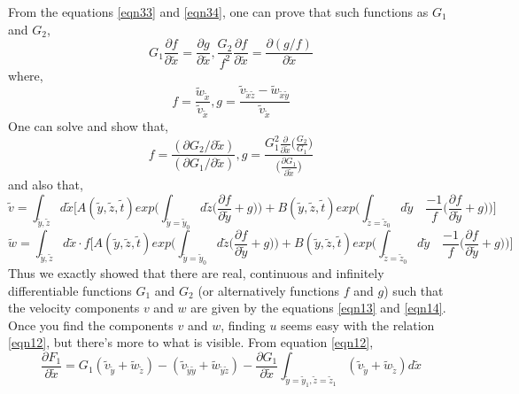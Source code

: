 \documentclass{article}
\begin{document}
From the equations \ref{eqn33} and \ref{eqn34}, one can prove that such functions as $G_1$ and $G_2$,
\begin{equation}
G_1 \frac{\partial f}{\partial \tilde{x}} = \frac{\partial g}{\partial \tilde{x}}, \frac{G_2}{f^2} \frac{\partial f}{\partial \tilde{x}} = \frac{\partial (g/f)}{\partial \tilde{x}}
\end{equation}
where,
\begin{equation*}
f = \frac{\tilde{w}_{\tilde{x}}}{\tilde{v}_{\tilde{x}}}, g = \frac{\tilde{v}_{\tilde{x}\tilde{z}}-\tilde{w}_{\tilde{x}\tilde{y}}}{\tilde{v}_{\tilde{x}}}
\end{equation*}
One can solve and show that,
\begin{equation*}
f = \frac{(\partial G_2/\partial \tilde{x})}{(\partial G_1/\partial \tilde{x})}, g = \frac{G_1^2 \frac{\partial}{\partial \tilde{x}}\bigg(\frac{G_2}{G_1}\bigg)}{\bigg(\frac{\partial G_1}{\partial \tilde{x}}\bigg)}
\end{equation*}
and also that,
\begin{equation} \label{eqn13}
\tilde{v} = \int_{\tilde{y},\tilde{z}} d\tilde{x} \bigg[A(\tilde{y},\tilde{z},\tilde{t}) exp\bigg(\int_{\tilde{y} = \tilde{y}_0} d\tilde{z} \bigg(\frac{\partial f}{\partial \tilde{y}}+g\bigg)\bigg) + B(\tilde{y},\tilde{z},\tilde{t}) exp\bigg(\int_{\tilde{z} = \tilde{z}_0} d\tilde{y} \quad \frac{-1}{f}\bigg(\frac{\partial f}{\partial \tilde{y}}+g\bigg)\bigg)\bigg]
\end{equation}
\begin{equation} \label{eqn14}
\tilde{w} = \int_{\tilde{y},\tilde{z}} d\tilde{x}\cdot f\bigg[A(\tilde{y},\tilde{z},\tilde{t}) exp\bigg(\int_{\tilde{y} = \tilde{y}_0} d\tilde{z} \bigg(\frac{\partial f}{\partial \tilde{y}}+g\bigg)\bigg) + B(\tilde{y},\tilde{z},\tilde{t}) exp\bigg(\int_{\tilde{z} = \tilde{z}_0} d\tilde{y} \quad \frac{-1}{f}\bigg(\frac{\partial f}{\partial \tilde{y}}+g\bigg)\bigg)\bigg]
\end{equation}
Thus we exactly showed that there are real, continuous and infinitely differentiable functions $G_1$ and $G_2$ (or alternatively functions $f$ and $g$) such that the velocity components $v$ and $w$ are given by the equations \ref{eqn13} and \ref{eqn14}. Once you find the components $v$ and $w$, finding $u$ seems easy with the relation \ref{eqn12}, but there's more to what is visible. From equation \ref{eqn12},
\begin{equation} \label{eqn36}
\frac{\partial F_1}{\partial \tilde{x}} = G_1 (\tilde{v}_{\tilde{y}}+\tilde{w}_{\tilde{z}}) - (\tilde{v}_{\tilde{y}\tilde{y}}+\tilde{w}_{\tilde{y}\tilde{z}}) - \frac{\partial G_1}{\partial \tilde{x}} \int_{\tilde{y}=\tilde{y}_1, \tilde{z}=\tilde{z}_1} (\tilde{v}_{\tilde{y}}+\tilde{w}_{\tilde{z}}) d\tilde{x}
\end{equation}
\end{document}
